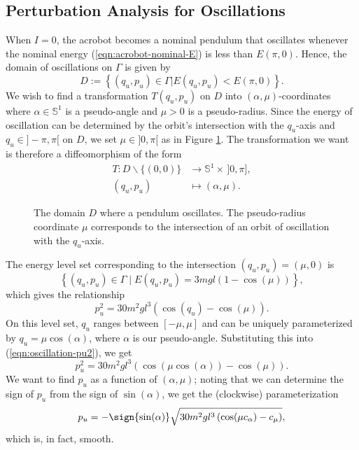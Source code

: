 \subsection*{Perturbation Analysis for Oscillations}
When \(I = 0\), the acrobot becomes a nominal pendulum that oscillates whenever the
nominal energy (\ref{eqn:acrobot-nominal-E}) is less than \(E(\pi,0)\).
Hence, the domain of oscillations on \(\Gamma\) is given by
\[
    D := \left\{ (q_u,p_u) \in \Gamma | E(q_u,p_u) < E(\pi,0)\right\}
    .
\]
We wish to find a transformation \(T(q_u,p_u)\) on \(D\) into
\((\alpha,\mu)\)-coordinates where \(\alpha \in \mathbb{S}^1\) is a pseudo-angle
and \(\mu > 0\) is a pseudo-radius.
Since the energy of oscillation can be determined by the orbit's intersection
with the \(q_u\)-axis and \(q_u \in ]-\pi,\pi[\) on \(D\), 
we set \(\mu \in ]0,\pi[\) as in Figure \ref{fig:mu-intersection}.
The transformation we want is therefore a diffeomorphism of the form
\begin{align*}
    T : D\backslash \{(0,0)\} &\rightarrow \mathbb{S}^1 \times \, ]0,\pi], \\
    (q_u, p_u) &\mapsto (\alpha,\mu)
    .
\end{align*}

\begin{figure}
    \centering
    \caption{The domain \(D\) where a pendulum oscillates.
    The pseudo-radius coordinate \(\mu\) corresponds to the
    intersection of an orbit of oscillation with the \(q_u\)-axis.}
    \label{fig:mu-intersection}
\end{figure}

The energy level set corresponding to the intersection \((q_u,p_u) = (\mu,0)\)
is 
\[
    \left\{(q_u,p_u) \in \Gamma \mid E(q_u,p_u) = 3mgl(1- \cos(\mu))\right\}
    ,
\]
which gives the relationship
\begin{equation}\label{eqn:oscillation-pu2}
    p_u^2 = 30m^2gl^3(\cos(q_u) - \cos(\mu))
    .
\end{equation}
On this level set, \(q_u\) ranges between \([-\mu,\mu]\) and can be uniquely
parameterized by \(q_u = \mu \cos(\alpha)\), where \(\alpha\) is our
pseudo-angle.
Substituting this into (\ref{eqn:oscillation-pu2}), we get
\[
    p_u^2 = 30m^2gl^3(\cos(\mu \cos(\alpha)) - \cos(\mu))
    .
\]
We want to find \(p_u\) as a function of \((\alpha,\mu)\); noting that we can
determine the sign of \(p_u\) from the sign of \(\sin(\alpha)\), we get the
(clockwise) parameterization
\begin{equation}\label{eqn:oscillation-pu}
    p_u = -\sign{\sin(\alpha)} \sqrt{30m^2gl^3 \left(\cos(\mu c_\alpha) - c_\mu\right)}
    ,
\end{equation}
which is, in fact, smooth.

